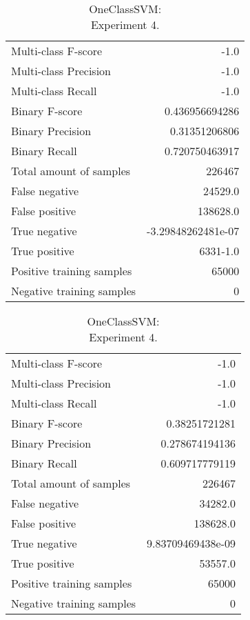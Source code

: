 \begin{table}[H]
\begin{minipage}{0.5\textwidth}
\caption{OneClassSVM: \\Experiment 3.}

\centering
\begin{tabular}{l r}
\toprule
Multi-class F-score & -1.0 \\
Multi-class Precision & -1.0 \\
Multi-class Recall & -1.0 \\
\midrule
Binary F-score & 0.436956694286 \\
Binary Precision & 0.31351206806 \\
Binary Recall & 0.720750463917 \\
\midrule
Total amount of samples & 226467 \\
False negative & 24529.0 \\
False positive & 138628.0 \\
True negative & -3.29848262481e-07 \\
True positive & 6331-1.0 \\
\midrule
Positive training samples & 65000 \\
Negative training samples & 0 \\
\bottomrule
\end{tabular}
\end{minipage}
\hfillx
\begin{minipage}{0.5\textwidth}

\caption{OneClassSVM: \\Experiment 4.}

\centering
\begin{tabular}{l r}
\toprule
Multi-class F-score & -1.0 \\
Multi-class Precision & -1.0 \\
Multi-class Recall & -1.0 \\
\midrule
Binary F-score & 0.38251721281 \\
Binary Precision & 0.278674194136 \\
Binary Recall & 0.609717779119 \\
\midrule
Total amount of samples & 226467 \\
False negative & 34282.0 \\
False positive & 138628.0 \\
True negative & 9.83709469438e-09 \\
True positive & 53557.0 \\
\midrule
Positive training samples & 65000 \\
Negative training samples & 0 \\
\bottomrule
\end{tabular}
\end{minipage}
\end{table}

